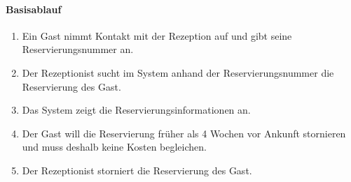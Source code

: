 \paragraph{Basisablauf}
\begin{enumerate}
\item Ein \Gls{Gast} nimmt Kontakt mit der \Gls{Rezeption} auf und gibt seine \Gls{Reservierungsnummer} an.
\item Der \Gls{Rezeptionist} sucht im System anhand der \Gls{Reservierungsnummer} die \Gls{Reservierung} des \Gls{Gast}.
\item Das System zeigt die Reservierungsinformationen an.
\item Der \Gls{Gast} will die \Gls{Reservierung} früher als 4 Wochen vor Ankunft stornieren und muss deshalb keine Kosten begleichen.
\item Der \Gls{Rezeptionist} storniert die Reservierung des \Gls{Gast}.
\end{enumerate}

